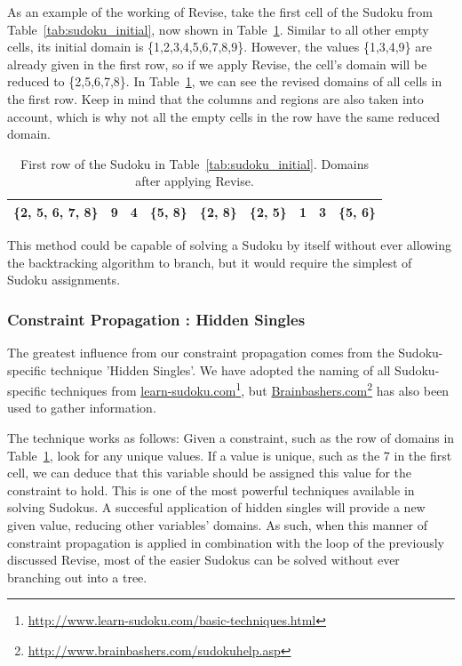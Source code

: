 \documentclass[11pt]{article} %
\begin{document}
As an example of the working of Revise, take the first cell of the Sudoku from Table~\ref{tab:sudoku_initial}, now shown in Table~\ref{tab:sudoku_frstrow_rev}. Similar to all other empty cells, its initial domain is \{1,2,3,4,5,6,7,8,9\}.
However, the values \{1,3,4,9\} are already given in the first row, so if we apply Revise, the cell's domain will be reduced to \{2,5,6,7,8\}.
In Table~\ref{tab:sudoku_frstrow_rev}, we can see the revised domains of all cells in the first row. Keep in mind that the columns and regions are also taken into account, which is why not all the empty cells in the row have the same reduced domain.

\begin{table}[htbp]
\caption{First row of the Sudoku in Table~\ref{tab:sudoku_initial}. Domains after applying Revise.}
    \label{tab:sudoku_frstrow_rev}

    \begin{center}
        \begin{tabular}{|c|c|c|c|c|c|c|c|c|}
        \hline
        \cellcolor[gray]{0.7}\{2, 5, 6, 7, 8\} & 9 & 4 & \{5, 8\} & \{2, 8\} & \{2, 5\} & 1 & 3 & \{5, 6\}\\
        \hline
        \end{tabular}
    \end{center}
\end{table}

This method could be capable of solving a Sudoku by itself without ever allowing the backtracking algorithm to branch, but it would require the simplest of Sudoku assignments.

\subsubsection{Constraint Propagation : Hidden Singles}

The greatest influence from our constraint propagation comes from the Sudoku-specific technique 'Hidden Singles'. We have adopted the naming of all Sudoku-specific techniques from \url{learn-sudoku.com}\footnote{\url{http://www.learn-sudoku.com/basic-techniques.html}}, but \url{Brainbashers.com}\footnote{\url{http://www.brainbashers.com/sudokuhelp.asp}} has also been used to gather information.

The technique works as follows: Given a constraint, such as the row of domains in Table~\ref{tab:sudoku_frstrow_rev}, look for any unique values. If a value is unique, such as the 7 in the first cell, we can deduce that this variable should be assigned this value for the constraint to hold.
This is one of the most powerful techniques available in solving Sudokus. A succesful application of hidden singles will provide a new given value, reducing other variables' domains. As such, when this manner of constraint propagation is applied in combination with the loop of the previously discussed Revise, most of the easier Sudokus can be solved without ever branching out into a tree.
\end{document}
